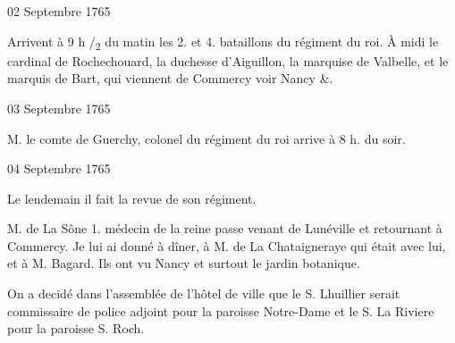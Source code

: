                      \begin{diary}{02 Septembre 1765}{}

                         Arrivent à 9 h /\textsubscript{2} du matin les 2.
                           et 4. bataillons du régiment du roi.
                           À midi le cardinal de Rochechouard, la
                              duchesse d'Aiguillon, la
                              marquise de
                              Valbelle, et le marquis de Bart, qui viennent
                           de Commercy voir Nancy \&. \bigskip


                     \end{diary}

                     \begin{diary}{03 Septembre 1765}{}


                           M. le comte de Guerchy, colonel
                           du régiment du
                           roi arrive à 8 h. du soir. \bigskip


                     \end{diary}

                     \begin{diary}{04 Septembre 1765}{}

                         Le lendemain il fait la revue de son régiment.
                        \bigskip



                           M. de La Sône 1. médecin de la
                              reine passe
                           venant de Lunéville et
                           retournant à Commercy.
                           Je lui ai donné à dîner, à M. de La
                              Chataigneraye
                           qui était avec lui, et à M.
                              Bagard. Ils ont
                           vu Nancy et surtout
                              le jardin botanique. \bigskip


                         On a decidé dans l'assemblée de
                              l'hôtel de
                              ville que le S.
                              Lhuillier serait commissaire de police
                           adjoint pour la paroisse
                              Notre-Dame et le S. La
                              Riviere
                           pour la paroisse S. Roch. \bigskip


                     \end{diary}

